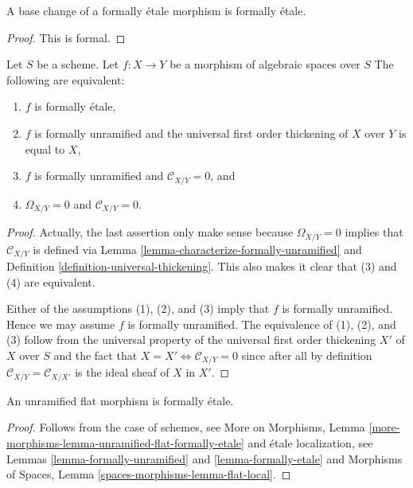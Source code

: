 \begin{lemma}
\label{lemma-base-change-formally-etale}
A base change of a formally \'etale morphism is formally \'etale.
\end{lemma}

\begin{proof}
This is formal.
\end{proof}

\begin{lemma}
\label{lemma-characterize-formally-etale}
Let $S$ be a scheme.
Let $f : X \to Y$ be a morphism of algebraic spaces over $S$
The following are equivalent:
\begin{enumerate}
\item $f$ is formally \'etale,
\item $f$ is formally unramified and the universal first order thickening
of $X$ over $Y$ is equal to $X$,
\item $f$ is formally unramified and $\mathcal{C}_{X/Y} = 0$, and
\item $\Omega_{X/Y} = 0$ and $\mathcal{C}_{X/Y} = 0$.
\end{enumerate}
\end{lemma}

\begin{proof}
Actually, the last assertion only make sense because $\Omega_{X/Y} = 0$
implies that $\mathcal{C}_{X/Y}$ is defined via
Lemma \ref{lemma-characterize-formally-unramified}
and
Definition \ref{definition-universal-thickening}.
This also makes it clear that (3) and (4) are equivalent.

\medskip\noindent
Either of the assumptions (1), (2), and (3) imply that $f$ is formally
unramified. Hence we may assume $f$ is formally unramified. The equivalence
of (1), (2), and (3) follow from the universal property of the universal
first order thickening $X'$ of $X$ over $S$ and the fact that
$X = X' \Leftrightarrow \mathcal{C}_{X/Y} = 0$ since
after all by definition $\mathcal{C}_{X/Y} = \mathcal{C}_{X/X'}$
is the ideal sheaf of $X$ in $X'$.
\end{proof}

\begin{lemma}
\label{lemma-unramified-flat-formally-etale}
An unramified flat morphism is formally \'etale.
\end{lemma}

\begin{proof}
Follows from the case of schemes, see
More on Morphisms,
Lemma \ref{more-morphisms-lemma-unramified-flat-formally-etale}
and \'etale localization, see
Lemmas \ref{lemma-formally-unramified} and \ref{lemma-formally-etale}
and
Morphisms of Spaces, Lemma \ref{spaces-morphisms-lemma-flat-local}.
\end{proof}


